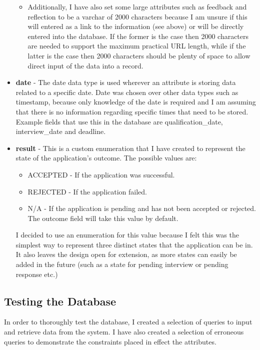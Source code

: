 \documentclass{article}
\begin{document}
\begin{itemize}
\begin{itemize}
\item Additionally, I have also set some large attributes such as feedback and reflection to be a varchar of 2000 characters because I am unsure if this will entered as a link to the information (see above) or will be directly entered into the database. If the former is the case then 2000 characters are needed to support the maximum practical URL length, while if the latter is the case then 2000 characters should be plenty of space to allow direct input of the data into a record.

\end{itemize}

\item \textbf{date} - The date data type is used wherever an attribute is storing data related to a specific date. Date was chosen over other data types such as timestamp, because only knowledge of the date is required and I am assuming that there is no information regarding specific times that need to be stored. Example fields that use this in the database are qualification\_date, interview\_date and deadline.

\item \textbf{result} - This is a custom enumeration that I have created to represent the state of the application's outcome. The possible values are:

\begin{itemize}
	\item ACCEPTED - If the application was successful.
	\item REJECTED - If the application failed.
	\item N/A - If the application is pending and has not been accepted or rejected. The outcome field will take this value by default.
\end{itemize}

I decided to use an enumeration for this value because I felt this was the simplest way to represent three distinct states that the application can be in. It also leaves the design open for extension, as more states can easily be added in the future (such as a state for pending interview or pending response etc.)

\end{itemize}

\subsection{Testing the Database}
In order to thoroughly test the database, I created a selection of queries to input and retrieve data from the system. I have also created a selection of erroneous queries to demonstrate the constraints placed in effect the attributes.
\end{document}
